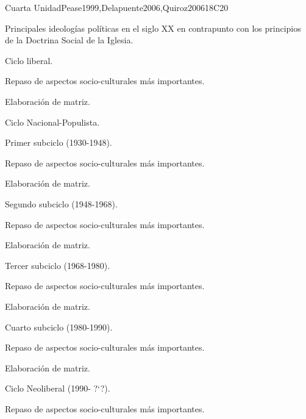 \begin{syllabus}
\begin{unit}{}{Cuarta Unidad}{Pease1999,Delapuente2006,Quiroz2006}{18}{C20}
\begin{topics}
    \item Principales ideologías políticas en el siglo XX en contrapunto con los principios de la Doctrina Social de la Iglesia.
    \item Ciclo liberal.
	\begin{subtopics}
	    \item Repaso de  aspectos socio-culturales más importantes.
	    \item Elaboración de matriz.
	\end{subtopics}
    \item Ciclo Nacional-Populista.
      \begin{subtopics}
	\item Primer subciclo (1930-1948).
	      \begin{subtopics}
		\item Repaso de  aspectos socio-culturales más importantes.
		\item Elaboración de matriz.
	      \end{subtopics}
	\item Segundo subciclo (1948-1968).
	      \begin{subtopics}
		\item Repaso de  aspectos socio-culturales más importantes.
		\item Elaboración de matriz.
	      \end{subtopics}
	\item Tercer subciclo (1968-1980).
	      \begin{subtopics}
		\item Repaso de  aspectos socio-culturales más importantes.
		\item Elaboración de matriz.
	      \end{subtopics}
	\item Cuarto subciclo (1980-1990).
	      \begin{subtopics}
		\item Repaso de  aspectos socio-culturales más importantes.
		\item Elaboración de matriz.
	    \end{subtopics}
      \end{subtopics}
    \item Ciclo Neoliberal (1990- ?`?).
	  \begin{subtopics}
	    \item Repaso de  aspectos socio-culturales más importantes.

\end{subtopics}
\end{topics}
\end{unit}
\end{syllabus}
